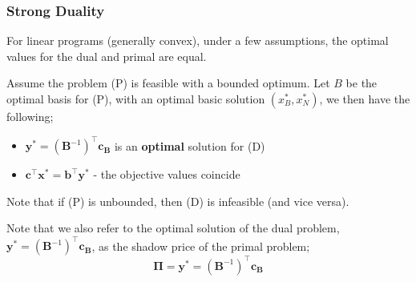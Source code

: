 \documentclass[a4paper, 12pt]{article}
\newcommand{\mat}[1]{\boldsymbol{#1}}
\renewcommand{\vec}[1]{\boldsymbol{#1}}
\begin{document}
            \subsubsection*{Strong Duality}
                For linear programs (generally convex), under a few assumptions, the optimal values for the dual and primal are equal.
                \medskip

                Assume the problem (P) is feasible with a bounded optimum.
                Let $B$ be the optimal basis for (P), with an optimal basic solution $(x^*_B, x^*_N)$, we then have the following;
                \begin{itemize}
                    \itemsep0em
                    \item $\vec{y^*} = \left(\mat{B}^{-1}\right)^\top\vec{c_B}$ is an \textbf{optimal} solution for (D)
                    \item $\vec{c}^\top\vec{x^*} = \vec{b}^\top\vec{y^*}$ - the objective values coincide
                \end{itemize}
                Note that if (P) is unbounded, then (D) is infeasible (and vice versa).
                \medskip

                Note that we also refer to the optimal solution of the dual problem, $\vec{y^*} = \left(\mat{B}^{-1}\right)^\top\vec{c_B}$, as the shadow price of the primal problem;
                $$\vec{\Pi} = \vec{y^*} = \left(\mat{B}^{-1}\right)^\top\vec{c_B}$$
                \medskip
\end{document}
